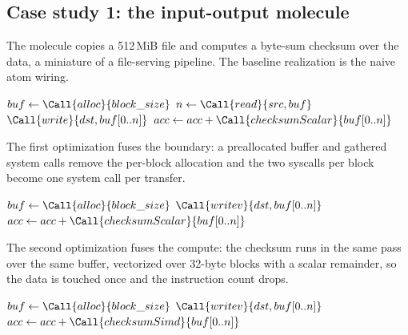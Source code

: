 \subsection{Case study 1: the input-output molecule}

The molecule copies a 512\,MiB file and computes a byte-sum checksum
over the data, a miniature of a file-serving pipeline. The baseline
realization is the naive atom wiring.

\begin{algorithm}[t]
\caption{Baseline: the input-output molecule (before).}
\begin{algorithmic}[1]
  \State $buf \gets \Call{alloc}{block\_size}$ 
  \State $n \gets \Call{read}{src, buf}$ 
  \State $\Call{write}{dst, buf[0..n]}$ 
  \State $acc \gets acc + \Call{checksumScalar}{buf[0..n]}$ 
\EndFor
\end{algorithmic}
\end{algorithm}

The first optimization fuses the boundary: a preallocated buffer and
gathered system calls remove the per-block allocation and the two
syscalls per block become one system call per transfer.

\begin{algorithm}[t]
\caption{Optimization 1: preallocation and gathering (after).}
\begin{algorithmic}[1]
\State $buf \gets \Call{alloc}{block\_size}$ 
  \State $\Call{writev}{dst, buf[0..n]}$
  \State $acc \gets acc + \Call{checksumScalar}{buf[0..n]}$
\EndWhile
\end{algorithmic}
\end{algorithm}

The second optimization fuses the compute: the checksum runs in the
same pass over the same buffer, vectorized over 32-byte blocks with a
scalar remainder, so the data is touched once and the instruction
count drops.

\begin{algorithm}[t]
\caption{Optimization 2: fused vectorized checksum (after).}
\begin{algorithmic}[1]
\State $buf \gets \Call{alloc}{block\_size}$
  \State $\Call{writev}{dst, buf[0..n]}$
  \State $acc \gets acc + \Call{checksumSimd}{buf[0..n]}$ 
\EndWhile
\end{algorithmic}
\end{algorithm}

